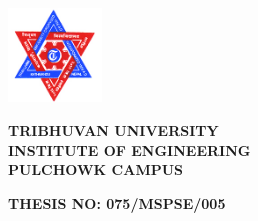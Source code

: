 


\begin{titlepage}
\begin{center}

\begin{center}
\includegraphics[width=25mm,height=25mm,keepaspectratio]{Figures/TU_dark_logo.jpeg}\\ %
\end{center}


\begin{center}
{\bfseries \normalsize \MakeUppercase{Tribhuvan University \\ \vspace{0.15cm}
    Institute of Engineering\\ \vspace{0.15cm}
    Pulchowk Campus}}
\end{center}


\vspace{1cm}


 \begin{flushleft}
 \textbf{{\normalsize \raggedleft THESIS NO: 075/MSPSE/005}} %
 \end{flushleft}


{\bfseries \normalsize \ttitle\par}\vspace{1cm} %
 

\end{center}
\end{titlepage}
